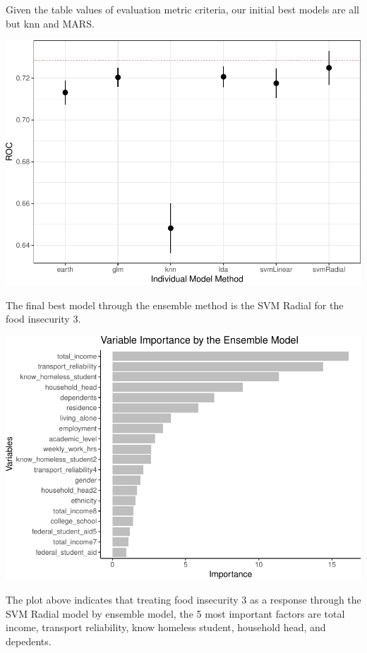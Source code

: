 \documentclass[
  10pt,
]{article}
\begin{document}
Given the table values of evaluation metric criteria, our initial best models are all but knn and MARS.\\

\begin{center}\includegraphics{phase2_report_files/figure-latex/unnamed-chunk-26-1} \end{center}

The final best model through the ensemble method is the SVM Radial for the food insecurity 3.\\

\begin{center}\includegraphics{phase2_report_files/figure-latex/unnamed-chunk-27-1} \end{center}

The plot above indicates that treating food insecurity 3 as a response through the SVM Radial model by ensemble model, the 5 most important factors are total income, transport reliability, know homeless student, household head, and depedents.\\
\end{document}
